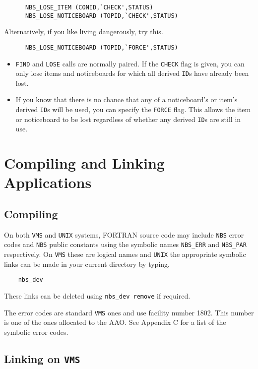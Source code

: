 \begin{verbatim}
      NBS_LOSE_ITEM (CONID,`CHECK',STATUS)
      NBS_LOSE_NOTICEBOARD (TOPID,`CHECK',STATUS)
\end{verbatim}

Alternatively, if you like living dangerously, try this.

\begin{verbatim}
      NBS_LOSE_NOTICEBOARD (TOPID,`FORCE',STATUS)
\end{verbatim}

\begin{itemize}
\item {\tt FIND} and {\tt LOSE} calls are normally paired. If the {\tt CHECK}
flag is given, you can only lose items and noticeboards for which all derived
{\tt ID}s have already been lost.
\item If you know that there is no chance that any of a noticeboard's or item's
derived {\tt ID}s will be used, you can specify the {\tt FORCE} flag. This
allows the item or noticeboard to be lost regardless of whether any derived
{\tt ID}s are still in use.
\end{itemize}

\section {Compiling and Linking Applications}

\subsection{Compiling}
On both {\tt VMS} and {\tt UNIX} systems, FORTRAN source code may
include {\tt NBS} error codes and {\tt NBS} public constants using
the symbolic names {\tt NBS\_ERR} and {\tt NBS\_PAR} respectively. 
On {\tt VMS} these are logical names and {\tt UNIX} the appropriate
symbolic links can be made in your current directory by typing,

\begin {verbatim}
    nbs_dev
\end{verbatim}

These links can be deleted using {\tt nbs\_dev remove} if required.

The error codes are standard {\tt VMS} ones and use facility number 1802. This
number is one of the ones allocated to the AAO. See Appendix C for a list of
the symbolic error codes.

\subsection{Linking on {\tt VMS}}


